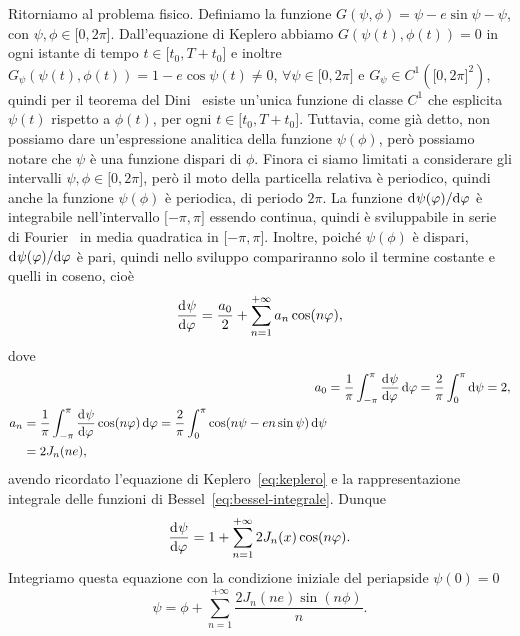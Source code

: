 Ritorniamo al problema fisico. Definiamo la funzione $G(\psi,\phi) = \psi -
e\sin\psi - \psi$, con $\psi,\phi\in\mathopen{[}0,
2\pi\mathclose{]}$. Dall'equazione di Keplero abbiamo $G(\psi(t),\phi(t)) = 0$
in ogni istante di tempo $t\in\mathopen{[}t_0,T+t_0\mathclose{]}$ e inoltre
$G_\psi(\psi(t),\phi(t)) = 1 - e\cos\psi(t) \neq 0$,
$\forall\psi\in\mathopen{[}0, 2\pi\mathclose{]}$ e $G_\psi\in C^1(\mathopen{[}0,
2\pi\mathclose{]}^2)$, quindi per il teorema del
Dini~\cite[267]{demarco:analisi2} esiste un'unica funzione di classe $C^1$ che
esplicita $\psi(t)$ rispetto a $\phi(t)$, per ogni
$t\in\mathopen{[}t_0,T+t_0\mathclose{]}$. Tuttavia, come già detto, non possiamo
dare un'espressione analitica della funzione $\psi(\phi)$, però possiamo notare
che $\psi$ è una funzione dispari di $\phi$. Finora ci siamo limitati a
considerare gli intervalli $\psi,\phi\in\mathopen{[}0, 2\pi\mathclose{]}$, però
il moto della particella relativa è periodico, quindi anche la funzione
$\psi(\phi)$ è periodica, di periodo $2\pi$.  La funzione
$\mathrm{d}^{}\psi(\varphi) / \mathrm{d} {\varphi}^{}$ è integrabile nell'intervallo $\mathopen{[}-\pi,
\pi\mathclose{]}$ essendo continua, quindi è sviluppabile in serie di
Fourier~\cite[440]{demarco:analisi2} in media quadratica in $\mathopen{[}-\pi,
\pi\mathclose{]}$. Inoltre, poiché $\psi(\phi)$ è dispari,
$\mathrm{d}^{}\psi(\varphi) / \mathrm{d} {\varphi}^{}$ è pari, quindi nello sviluppo compariranno solo il
termine costante e quelli in coseno, cioè
\begin{equation}
  \frac{{\mathop{}\!\mathrm{d}^{}}\psi}{\mathop{}\!\mathrm{d} {\varphi}^{}} = \frac{a_0}{2} + \sum_{n=1}^{+\infty}a_n\cos(n\varphi),
\end{equation}
dove
\begin{align}
  a_0 &= \frac{1}{\pi}\int_{-\pi}^{\pi}\toder{\psi}{\phi}\dd\phi =
  \frac{2}{\pi}\int_0^\pi\dd\psi = 2,\\
  \begin{split}
    a_n &= \frac{1}{\pi}\int_{-\pi}^\pi\toder{\psi}{\phi}\cos(n\phi)\dd\phi =
    \frac{2}{\pi}\int_0^\pi\cos(n\psi - en\sin\psi)\dd\psi \\
    &= 2J_n(ne),
  \end{split}
\end{align}
avendo ricordato l'equazione di Keplero~\eqref{eq:keplero} e la rappresentazione
integrale delle funzioni di Bessel~\eqref{eq:bessel-integrale}. Dunque
\begin{equation}
  \frac{{\mathop{}\!\mathrm{d}^{}}\psi}{\mathop{}\!\mathrm{d} {\varphi}^{}} = 1 + \sum_{n=1}^{+\infty}2J_n(x)\cos(n\varphi).
\end{equation}
Integriamo questa equazione con la condizione iniziale del periapside $\psi(0) =
0$
\begin{equation}
  \psi = \phi + \sum_{n=1}^{+\infty}\frac{2J_n(ne)\sin(n\phi)}{n}.
\end{equation}

